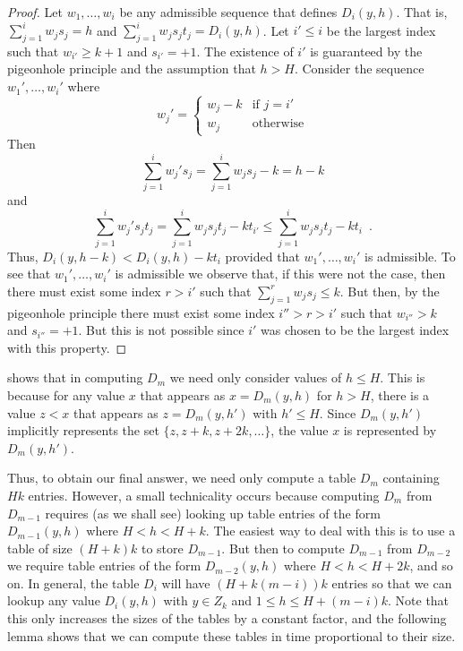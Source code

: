 \documentclass[11pt]{patmorin}
\begin{document}
\begin{proof}
Let $w_1,\ldots,w_i$ be any admissible sequence that defines
$D_i(y,h)$.  That is,  $\sum_{j=1}^iw_js_j = h$ and $\sum_{j=1}^i w_js_jt_j
= D_i(y,h)$.  Let $i'\le i$ be the largest index such that
$w_{i'}\ge k+1$ and $s_{i'}=+1$.  The existence of $i'$ is guaranteed
by the pigeonhole principle and the
assumption that $h>H$.  Consider the sequence $w_1',\ldots,w_i'$ where
\[
     w_j' = \left\{ \begin{array}{ll}
            w_j-k & \mbox{if $j=i'$} \\
            w_j & \mbox{otherwise}  \end{array} \right.
\]
Then
\[
  \sum_{j=1}^i w_j's_j = \sum_{j=1}^i w_js_j - k = h-k
\]
and
\[
   \sum_{j=1}^i w_j's_jt_j = \sum_{j=1}^i w_js_jt_j - kt_{i'} 
    \le \sum_{j=1}^i w_js_jt_j - kt_{i} \enspace . 
\]
Thus, $D_i(y,h-k) < D_i(y,h) - kt_i$ provided that $w_1',\ldots,w_i'$
is admissible.  To see that $w_1',\ldots,w_i'$ is admissible we
observe that, if this were not the case, then there must exist some
index $r>i'$ such that $\sum_{j=1}^r w_js_j \le k$.  But then, by the
pigeonhole principle there
must exist some index $i''>r>i'$ such that $w_{i''}>k$ and
$s_{i''}=+1$.  But this is not possible since $i'$ was chosen to be
the largest index with this property.
\end{proof}

 shows that in computing $D_m$ we need only consider
values of $h\le H$.  This is because for any value $x$ that appears as
$x=D_m(y,h)$ for $h>H$, there is a value $z< x$ that appears as
$z=D_m(y,h')$ with $h'\le H$.  Since $D_m(y,h')$ implicitly represents the
set $\{z, z+k, z+2k,\ldots\}$, the value $x$ is represented by
$D_m(y,h')$.

Thus, to obtain our final answer, we need only compute a
table $D_m$ containing $Hk$ entries.  However, a small technicality
occurs because computing $D_m$ from $D_{m-1}$ requires (as we shall
see) looking up table entries of the form $D_{m-1}(y,h)$ where
$H<h<H+k$.  The easiest way to deal with this is to use a table of
size $(H+k)k$ to store $D_{m-1}$.  But then to compute $D_{m-1}$ from
$D_{m-2}$ we require table entries of the form $D_{m-2}(y,h)$ where
$H<h<H+2k$, and so on.  In general, the table $D_i$ will have
$(H+k(m-i))k$ entries so that we can lookup any value $D_i(y,h)$ with
$y\in Z_k$ and $1\le h\le H+(m-i)k$.  Note that this only increases
the sizes of the tables by a constant factor, and the following lemma
shows that we can compute these tables in time proportional to their
size.
\end{document}
